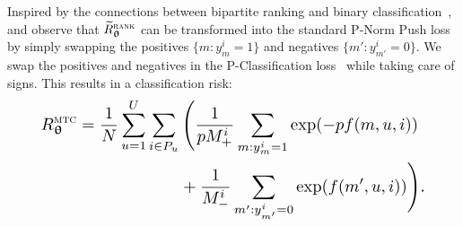 

Inspired by the connections between bipartite ranking and binary classification~\cite{ertekin2011equivalence,menon2016bipartite},
and observe that $\widetilde R_{{\bm{\uptheta}}}^{\textsc{rank}}$ can be transformed into the standard P-Norm Push loss~\cite{rudin2009p} 
by simply swapping the positives {\small $\{m: y_m^i = 1\}$} and negatives {\small $\{m': y_{m'}^i = 0\}$}. %
We swap the positives and negatives in the P-Classification loss~\cite{ertekin2011equivalence} while taking care of signs.
This results in a classification risk:
\begin{equation}
\label{eq:clfrisk}
\resizebox{.888\linewidth}{!}{$\displaystyle
\begin{aligned}
R_{\upthetabm}^{\textsc{mtc}}
= \frac{1}{N} \sum_{u=1}^U 
& \sum_{i \in P_u} \Bigg(
  \frac{1}{p M_+^i} \sum_{m: y_m^i = 1} \exp(-p f(m, u, i)) \\
& \hspace{2em}  + \frac{1}{M_-^i} \sum_{m': y_{m'}^i = 0} \exp(f(m', u, i)) \Bigg).
\end{aligned}
$}
\end{equation}




